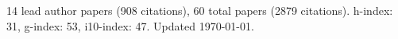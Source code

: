 14 lead author papers (908 citations),
60 total papers (2879 citations).\newline
h-index: 31, g-index: 53, i10-index: 47. Updated \today.